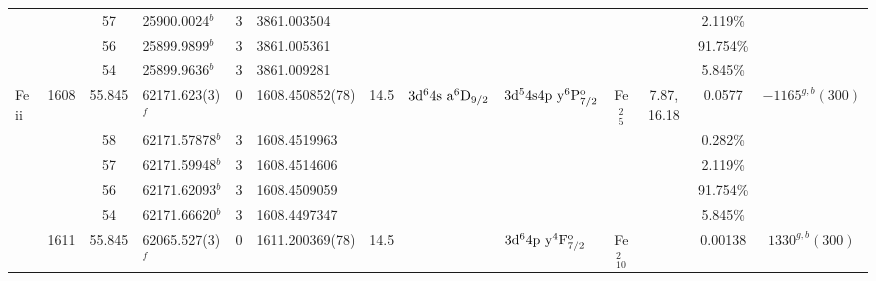 \begin{table*}
\begin{center}
{\begin{tabular}{:l;l;c;l;c;l;c;l;l;c;c;c;c}
\rowstyle{\itshape}               &        & 57        & 25900.0024$^{b}$                 & 3 &   3861.003504      &      & $                                        $ & $                                        $ &             &              & 2.119\%   & $     ^{}     $\\
\rowstyle{\itshape}               &        & 56        & 25899.9899$^{b}$                 & 3 &   3861.005361      &      & $                                        $ & $                                        $ &             &              & 91.754\%  & $     ^{}     $\\
\rowstyle{\itshape}               &        & 54        & 25899.9636$^{b}$                 & 3 &   3861.009281      &      & $                                        $ & $                                        $ &             &              & 5.845\%   & $     ^{}     $\\
                    Fe{\sc \,ii}  & 1608   & 55.845    & 62171.623(3)$^{f}$               & 0 &   1608.450852(78)  & 14.5 & $3\rm{d}^64\rm{s~a}^6\rm{D}_{9/2}        $ & $3\rm{d}^54\rm{s}4\rm{p~y}^6\rm{P}_{7/2}^{\rm o}$ & Fe$^2_{5}$  & 7.87, 16.18  & 0.0577    & $-1165^{g,b}(300)$\\
\rowstyle{\itshape}               &        & 58        & 62171.57878$^{b}$                & 3 &  1608.4519963      &      & $                                        $ & $                                        $ &             &              & 0.282\%   & $     ^{}     $\\
\rowstyle{\itshape}               &        & 57        & 62171.59948$^{b}$                & 3 &  1608.4514606      &      & $                                        $ & $                                        $ &             &              & 2.119\%   & $     ^{}     $\\
\rowstyle{\itshape}               &        & 56        & 62171.62093$^{b}$                & 3 &  1608.4509059      &      & $                                        $ & $                                        $ &             &              & 91.754\%  & $     ^{}     $\\
\rowstyle{\itshape}               &        & 54        & 62171.66620$^{b}$                & 3 &  1608.4497347      &      & $                                        $ & $                                        $ &             &              & 5.845\%   & $     ^{}     $\\
                                  & 1611   & 55.845    & 62065.527(3)$^{f}$               & 0 &   1611.200369(78)  & 14.5 & $                                        $ & $3\rm{d}^64\rm{p~y}^4\rm{F}_{7/2}^{\rm o}$ & Fe$^2_{10}$ &              & 0.00138   & $ 1330^{g,b}(300)$\\

\end{tabular}}
\end{center}
\end{table*}
